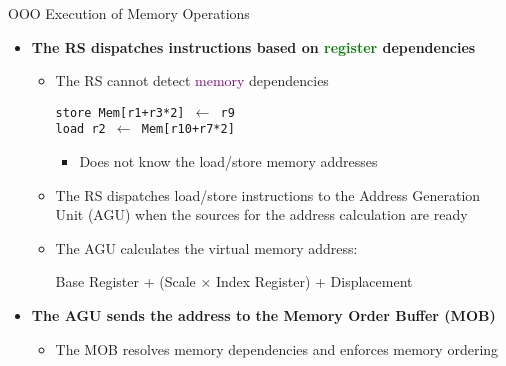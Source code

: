 \documentclass[aspectratio=169,12pt]{beamer}
\begin{document}
\begin{frame}{OOO Execution of Memory Operations}
  \begin{itemize}
    \item \textbf{The RS dispatches instructions based on \textcolor{green}{register} dependencies}
    \begin{itemize}
      \item The RS cannot detect \textcolor{purple}{memory} dependencies
      \begin{center}
        \texttt{store Mem[r1+r3*2] $\leftarrow$ r9}\\
        \texttt{load  r2 $\leftarrow$ Mem[r10+r7*2]}
      \end{center}
      \begin{itemize}
        \item Does not know the load/store memory addresses
      \end{itemize}
      
      \item The RS dispatches load/store instructions to the Address Generation Unit (AGU) when the sources for the address calculation are ready
      
      \item The AGU calculates the virtual memory address:
      \begin{center}
        \colorbox{gray!20}{Base Register + (Scale × Index Register) + Displacement}
      \end{center}
    \end{itemize}
    
    \item \textbf{The AGU sends the address to the Memory Order Buffer (MOB)}
    \begin{itemize}
      \item The MOB resolves memory dependencies and enforces memory ordering
    \end{itemize}
  \end{itemize}
\end{frame}
\end{document}

